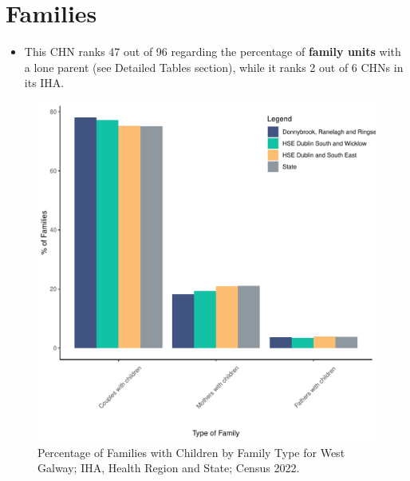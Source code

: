\documentclass{article}
\begin{document}
\section{Families}\label{sect:Fam}
\begin{itemize}
\item This CHN ranks  47 out of 96 regarding the percentage of \textbf{family units} with a lone parent (see Detailed Tables section), while it ranks   2 out of 6 CHNs in its IHA.
\end{itemize}
\begin{figure}[H]
	\centering
	\includegraphics[width = 150mm]{../figures/FamED.pdf}
	\caption{Percentage of Families with Children by Family Type for West Galway; IHA, Health Region and State; Census 2022.}
	\label{fig:vbnv}
	\end{figure}
	
\end{document}
